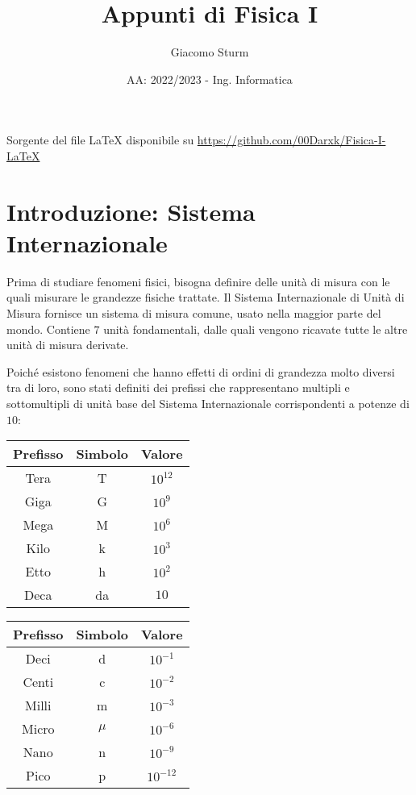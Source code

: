 \documentclass{article}
\title{Appunti di Fisica I}
\author{Giacomo Sturm}
\date{AA: 2022/2023 - Ing. Informatica}
\numberwithin{equation}{subsection}
\begin{document}
\maketitle

\vspace{10mm}

\begin{center}
    Sorgente del file LaTeX disponibile su \url{https://github.com/00Darxk/Fisica-I-LaTeX}
\end{center}

\clearpage

\tableofcontents

\clearpage

\section{Introduzione: Sistema Internazionale}

Prima di studiare fenomeni fisici, bisogna definire delle unità di misura con le quali misurare le grandezze fisiche trattate. Il Sistema Internazionale 
di Unità di Misura fornisce un sistema di misura comune, usato nella maggior parte del mondo. Contiene $7$ unità fondamentali, dalle quali vengono 
ricavate tutte le altre unità di misura derivate. 

Poiché esistono fenomeni che hanno effetti di ordini di grandezza molto diversi tra di loro, sono stati definiti dei prefissi che rappresentano multipli e sottomultipli di 
unità base del Sistema Internazionale corrispondenti a potenze di $10$:
\begin{center}
    \begin{tabular}{|c|c|c|}
        \hline
        Prefisso & Simbolo & Valore\\
        \hline
        Tera & T & $10^{12}$\\
        \hline
        Giga & G &$10^{9}$\\
        \hline
        Mega & M &$10^6$\\
        \hline
        Kilo & k & $10^3$\\
        \hline
        Etto & h & $10^2$\\
        \hline
        Deca & da & $10$\\
        \hline
    \end{tabular}
    \begin{tabular}{|c|c|c|}
        \hline
        Prefisso & Simbolo & Valore\\
        \hline
        Deci & d & $10^{-1}$\\
        \hline
        Centi & c &$10^{-2}$\\
        \hline
        Milli & m &$10^{-3}$\\
        \hline
        Micro &  $\mu$ & $10^{-6}$\\
        \hline
        Nano & n & $10^{-9}$\\
        \hline
        Pico & p & $10^{-12}$\\
        \hline
    \end{tabular}
\end{center}
\end{document}
